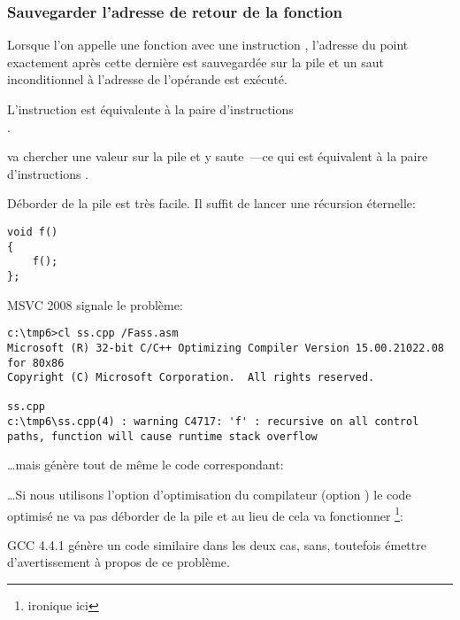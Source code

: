 ﻿\subsubsection{Sauvegarder l'adresse de retour de la fonction}


Lorsque l'on appelle une fonction avec une instruction \CALL, l'adresse du point
exactement après cette dernière est sauvegardée sur la pile et un saut inconditionnel
à l'adresse de l'opérande \CALL est exécuté.

L'instruction \CALL est équivalente à la paire d'instructions\\
.

\RET va chercher une valeur sur la pile et y saute~---ce qui est équivalent à
la paire d'instructions .

\myindex{\Stack!\MLStackOverflow}
\myindex{\Recursion}
Déborder de la pile est très facile. Il suffit de lancer une récursion éternelle:

\begin{lstlisting}[style=customc]
void f()
{
	f();
};
\end{lstlisting}

MSVC 2008 signale le problème:

\begin{lstlisting}
c:\tmp6>cl ss.cpp /Fass.asm
Microsoft (R) 32-bit C/C++ Optimizing Compiler Version 15.00.21022.08 for 80x86
Copyright (C) Microsoft Corporation.  All rights reserved.

ss.cpp
c:\tmp6\ss.cpp(4) : warning C4717: 'f' : recursive on all control paths, function will cause runtime stack overflow
\end{lstlisting}

\dots mais génère tout de même le code correspondant:



\dots Si nous utilisons l'option d'optimisation du compilateur (option \TT{\Ox})
le code optimisé ne va pas déborder de la pile et au lieu de cela va fonctionner
\footnote{ironique ici}:



GCC 4.4.1 génère un code similaire dans les deux cas, sans, toutefois émettre
d'avertissement à propos de ce problème.

